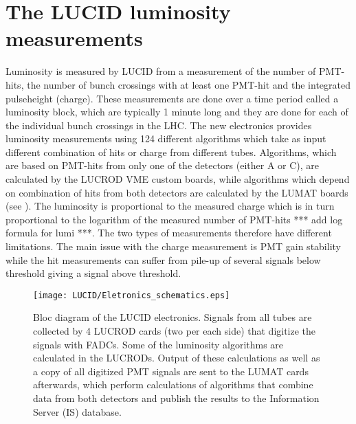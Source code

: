 \section{The LUCID luminosity measurements}


Luminosity is measured by LUCID from a measurement of the number of PMT-hits, the number of bunch crossings 
with at least one PMT-hit and the integrated pulseheight (charge). These measurements are done over a time 
period called a luminosity block, which are typically 1 minute long and they are done for each of the 
individual bunch crossings in the LHC. 
The new electronics provides luminosity measurements using 124 different algorithms which take as input 
different combination of hits or charge from different tubes. Algorithms, which are based on PMT-hits from only 
one of the detectors (either A or C), are calculated by the LUCROD VME custom boards, while algorithms which depend on 
combination of hits from both detectors are calculated by the LUMAT boards (see 
).
The luminosity is proportional to the measured charge which is in turn proportional to the logarithm of the measured 
number of PMT-hits *** add log formula for lumi ***. The two types of measurements therefore have different limitations. 
The main issue with the 
charge measurement is PMT gain stability while the hit measurements can suffer from pile-up of several signals 
below threshold giving a signal above threshold.

\begin{figure}
\centering
\texttt{[image: LUCID/Eletronics\_schematics.eps]}
\caption{Bloc diagram of the LUCID electronics. Signals from all tubes are collected by 4 \mbox{LUCROD} cards 
(two per 
each side) that digitize the signals with FADCs. Some of the luminosity algorithms are calculated in the LUCRODs. 
Output of these calculations as well as a copy of all digitized PMT 
signals are sent to the LUMAT cards afterwards, which perform calculations of algorithms that combine data from 
both detectors and publish the results to the Information Server (IS) database.}
\label{fig:Eletronics_schematics}
\end{figure}


